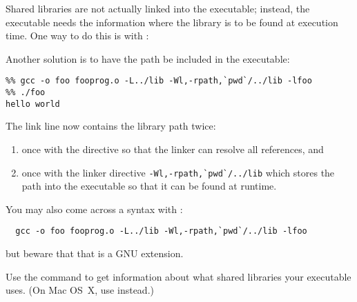 Shared libraries are not actually linked into the executable;
instead, the executable needs the information where the library
is to be found at execution time. One way to do this is with
:


Another solution is to have the path be included in the executable:
\begin{verbatim}
%% gcc -o foo fooprog.o -L../lib -Wl,-rpath,`pwd`/../lib -lfoo
%% ./foo
hello world
\end{verbatim}
The link line now contains the library path twice:
\begin{enumerate}
\item once with the  directive so that the linker can resolve
  all references, and
\item once with the linker directive \verb+-Wl,-rpath,`pwd`/../lib+ which
  stores the path into the executable so that it can be found at runtime.
\end{enumerate}

\begin{remark}
  You may also come across a syntax with :
\begin{verbatim}
  gcc -o foo fooprog.o -L../lib -Wl,-rpath,`pwd`/../lib -lfoo
\end{verbatim}
but beware that that is a GNU extension.
\end{remark}

Use the command  to get information about what shared libraries
your executable uses. (On Mac OS~X, use  instead.)




